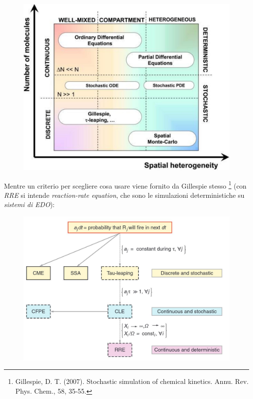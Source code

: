 \documentclass[a4paper,12pt, oneside]{book}
\begin{document}
\begin{figure}[H]
  \centering
  \includegraphics[scale = 0.15]{img/algo2.jpg}
\end{figure}
Mentre un criterio per scegliere cosa usare viene fornito da Gillespie stesso
\footnote{Gillespie, D. T. (2007). Stochastic simulation of chemical
  kinetics. Annu. Rev. Phys. Chem., 58, 35-55.} (con \textit{RRE} si intende
\textit{reaction-rate equation}, che sono le simulazioni deterministiche su
\textit{sistemi di EDO}):
\begin{figure}[H]
  \centering
  \includegraphics[scale = 0.2]{img/algo3.jpg}
\end{figure}
\end{document}
